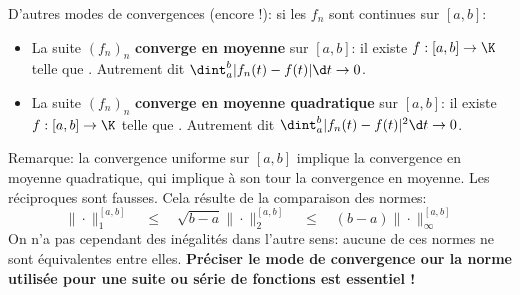 \smallskip

D'autres modes de convergences (encore !): si les $f_n$ sont continues
sur $[a,b]$:
\begin{itemize}
  \setlength\itemsep{0.6em}
\item La suite $(f_n)_n$ \textbf{converge en moyenne} sur $[a,b]$:
  il existe $f:[a,b]\to \K$ telle que . Autrement dit $\dint_a^b|f_n(t)-f(t)|\d t\to 0$.
\item La suite $(f_n)_n$ \textbf{converge en moyenne quadratique} sur $[a,b]$:
  il existe $f:[a,b]\to \K$ telle que . Autrement dit $\dint_a^b|f_n(t)-f(t)|^2\d t\to 0$.
\end{itemize}

Remarque: la convergence uniforme sur $[a,b]$ implique la convergence
en moyenne quadratique, qui implique à son tour la convergence en
moyenne. Les réciproques sont fausses. Cela résulte de la comparaison
des normes:
\[\|\cdot\|_1^{[a,b]}\quad\le\quad
  \sqrt{b-a}\|\cdot\|_2^{[a,b]}\quad\le\quad
  (b-a)\|\cdot\|_{\infty}^{[a,b]}\]
On n'a pas cependant des inégalités dans l'autre sens: aucune de ces
normes ne sont équivalentes entre elles. \textbf{Préciser le mode de
  convergence our la norme utilisée pour une suite ou série de
  fonctions est essentiel !}